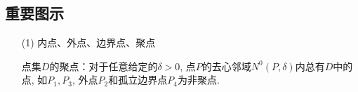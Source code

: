 \documentclass[12pt,UTF8]{ctexart}
\begin{document}
\subsection{重要图示}
\begin{enumerate}
\begin{enumerate}
\item[(1)]内点、外点、边界点、聚点

点集$D$的聚点：对于任意给定的$\delta>0$, 点$P$的去心邻域$N^0(P,\delta)$内总有$D$中的点, 如$P_1,P_3$, 外点$P_2$和孤立边界点$P_4$为非聚点.
\begin{figure}[H]
\begin{center}

\end{center}
\end{figure}
\end{enumerate}
\end{enumerate}
\end{document}
